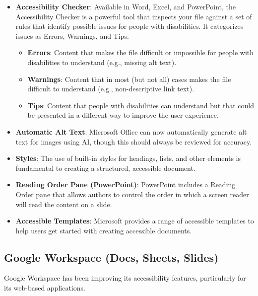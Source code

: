 \begin{itemize}
	\item \textbf{Accessibility Checker}: Available in Word, Excel, and PowerPoint, the Accessibility Checker is a powerful tool that inspects your file against a set of rules that identify possible issues for people with disabilities. It categorizes issues as Errors, Warnings, and Tips.
	      \begin{itemize}
		      \item \textbf{Errors}: Content that makes the file difficult or impossible for people with disabilities to understand (e.g., missing alt text).
		      \item \textbf{Warnings}: Content that in most (but not all) cases makes the file difficult to understand (e.g., non-descriptive link text).
		      \item \textbf{Tips}: Content that people with disabilities can understand but that could be presented in a different way to improve the user experience.
	      \end{itemize}
	\item \textbf{Automatic Alt Text}: Microsoft Office can now automatically generate alt text for images using AI, though this should always be reviewed for accuracy.
	\item \textbf{Styles}: The use of built-in styles for headings, lists, and other elements is fundamental to creating a structured, accessible document.
	\item \textbf{Reading Order Pane (PowerPoint)}: PowerPoint includes a Reading Order pane that allows authors to control the order in which a screen reader will read the content on a slide.
	\item \textbf{Accessible Templates}: Microsoft provides a range of accessible templates to help users get started with creating accessible documents.
\end{itemize}

\subsection{Google Workspace (Docs, Sheets, Slides)}
\label{subsec:google-workspace-accessibility}

Google Workspace has been improving its accessibility features, particularly for its web-based applications.

